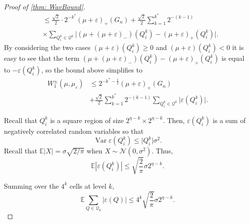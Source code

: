 \documentclass{article}
\theoremstyle{plain}
\theoremstyle{definition}
\theoremstyle{remark}
\begin{document}
\begin{proof}[Proof of \cref{thm: WavBound}]
\begin{align}
    &\le \tfrac{\sqrt{2}}{2} \cdot 2^{-k^*}  (\mu + \varepsilon)_+ (G_n)
    + \tfrac{\sqrt{2}}{2} \sum_{k=1}^{k^*} 2^{-(k-1)} \nonumber \\
    &\times \sum _{Q_i^k\in \mathcal{Q}^k} \big\lvert (\mu + (\mu + \varepsilon)_-)(Q_i^k)-(\mu + \varepsilon)_+ (Q_i^k) \big\rvert. \nonumber
\end{align}
By considering the two cases $(\mu + \varepsilon)(Q_i^k) \ge 0$ and $(\mu + \varepsilon)(Q_i^k) < 0$ it is easy to see that the term $(\mu + (\mu + \varepsilon)_-)(Q_i^k)-(\mu + \varepsilon)_+ (Q_i^k)$ is equal to  $-\varepsilon(Q_i^k)$, so the bound above simplifies to
\begin{align} \label{eq:WeedBach_bound_simplified}
    W_1^\pm\left(\mu, \mu_\varepsilon\right)
    &\le
    2^{-k^* - \tfrac{1}{2}}  (\mu + \varepsilon)_+ (G_n)
    \\&+
    \frac{\sqrt{2}}{2}
    \sum_{k=1}^{k^*} 2^{-(k-1)} \sum _{Q_i^k\in \mathcal{Q}^k} \lvert \varepsilon(Q_i^k)  \rvert.
\end{align}

Recall that $Q_i^k$ is a square region of size $2^{\eta-k}\times 2^{\eta-k}$. Then, $\varepsilon(Q_i^k)$ is a sum of negatively correlated random variables so that 
\[
\operatorname{Var} \varepsilon(Q_i^k) \le \lvert Q_i^k\rvert \sigma^2.
\]
Recall that $\mathbb{E} \lvert X \rvert = \sigma \sqrt{2/\pi}$ when $X \sim \mathcal{N}(0, \sigma^2)$. 
Thus, 
\begin{equation}
    \mathbb E|\varepsilon(Q_i^k)|
    \le
    \sqrt{\frac{2}\pi} \sigma  2^{\eta-k} .
\end{equation}


Summing over the $4^k$ cells at level $k$,
\begin{equation}
    \mathbb E\sum_{Q\in\mathcal Q_k}|\varepsilon(Q)|
    \le
    4^k \sqrt{\frac{2}\pi} \sigma  2^{\eta-k} .
\end{equation}


\end{proof}
\end{document}
